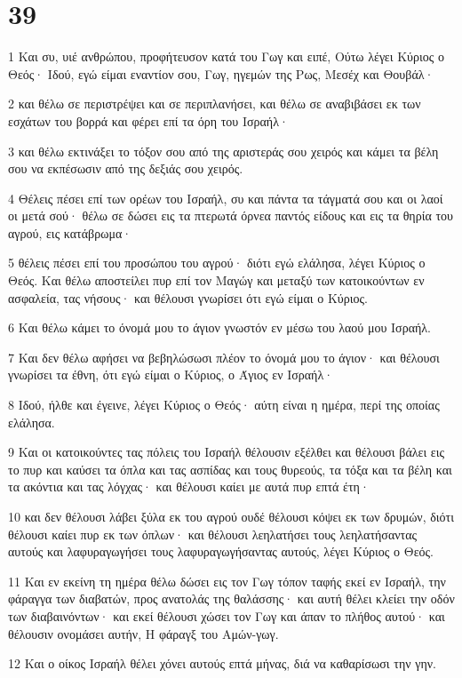 \chapter{39}

\par 1 Και συ, υιέ ανθρώπου, προφήτευσον κατά του Γωγ και ειπέ, Ούτω λέγει Κύριος ο Θεός· Ιδού, εγώ είμαι εναντίον σου, Γωγ, ηγεμών της Ρως, Μεσέχ και Θουβάλ·
\par 2 και θέλω σε περιστρέψει και σε περιπλανήσει, και θέλω σε αναβιβάσει εκ των εσχάτων του βορρά και φέρει επί τα όρη του Ισραήλ·
\par 3 και θέλω εκτινάξει το τόξον σου από της αριστεράς σου χειρός και κάμει τα βέλη σου να εκπέσωσιν από της δεξιάς σου χειρός.
\par 4 Θέλεις πέσει επί των ορέων του Ισραήλ, συ και πάντα τα τάγματά σου και οι λαοί οι μετά σού· θέλω σε δώσει εις τα πτερωτά όρνεα παντός είδους και εις τα θηρία του αγρού, εις κατάβρωμα·
\par 5 θέλεις πέσει επί του προσώπου του αγρού· διότι εγώ ελάλησα, λέγει Κύριος ο Θεός. Και θέλω αποστείλει πυρ επί τον Μαγώγ και μεταξύ των κατοικούντων εν ασφαλεία, τας νήσους· και θέλουσι γνωρίσει ότι εγώ είμαι ο Κύριος.
\par 6 Και θέλω κάμει το όνομά μου το άγιον γνωστόν εν μέσω του λαού μου Ισραήλ.
\par 7 Και δεν θέλω αφήσει να βεβηλώσωσι πλέον το όνομά μου το άγιον· και θέλουσι γνωρίσει τα έθνη, ότι εγώ είμαι ο Κύριος, ο Άγιος εν Ισραήλ·
\par 8 Ιδού, ήλθε και έγεινε, λέγει Κύριος ο Θεός· αύτη είναι η ημέρα, περί της οποίας ελάλησα.
\par 9 Και οι κατοικούντες τας πόλεις του Ισραήλ θέλουσιν εξέλθει και θέλουσι βάλει εις το πυρ και καύσει τα όπλα και τας ασπίδας και τους θυρεούς, τα τόξα και τα βέλη και τα ακόντια και τας λόγχας· και θέλουσι καίει με αυτά πυρ επτά έτη·
\par 10 και δεν θέλουσι λάβει ξύλα εκ του αγρού ουδέ θέλουσι κόψει εκ των δρυμών, διότι θέλουσι καίει πυρ εκ των όπλων· και θέλουσι λεηλατήσει τους λεηλατήσαντας αυτούς και λαφυραγωγήσει τους λαφυραγωγήσαντας αυτούς, λέγει Κύριος ο Θεός.
\par 11 Και εν εκείνη τη ημέρα θέλω δώσει εις τον Γωγ τόπον ταφής εκεί εν Ισραήλ, την φάραγγα των διαβατών, προς ανατολάς της θαλάσσης· και αυτή θέλει κλείει την οδόν των διαβαινόντων· και εκεί θέλουσι χώσει τον Γωγ και άπαν το πλήθος αυτού· και θέλουσιν ονομάσει αυτήν, Η φάραγξ του Αμών-γωγ.
\par 12 Και ο οίκος Ισραήλ θέλει χόνει αυτούς επτά μήνας, διά να καθαρίσωσι την γην.
